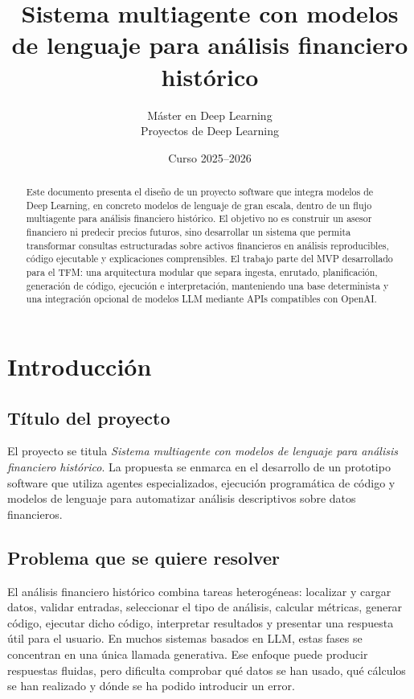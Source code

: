 \documentclass[11pt,a4paper]{article}
\title{\textbf{Sistema multiagente con modelos de lenguaje para an\'alisis financiero hist\'orico}}
\author{M\'aster en Deep Learning\\Proyectos de Deep Learning}
\date{Curso 2025--2026}
\let\oldsection\section
\renewcommand{\section}{\clearpage\oldsection}
\begin{document}
\maketitle

\begin{abstract}
Este documento presenta el dise\~no de un proyecto software que integra modelos de Deep Learning, en concreto modelos de lenguaje de gran escala, dentro de un flujo multiagente para an\'alisis financiero hist\'orico. El objetivo no es construir un asesor financiero ni predecir precios futuros, sino desarrollar un sistema que permita transformar consultas estructuradas sobre activos financieros en an\'alisis reproducibles, c\'odigo ejecutable y explicaciones comprensibles. El trabajo parte del MVP desarrollado para el TFM: una arquitectura modular que separa ingesta, enrutado, planificaci\'on, generaci\'on de c\'odigo, ejecuci\'on e interpretaci\'on, manteniendo una base determinista y una integraci\'on opcional de modelos LLM mediante APIs compatibles con OpenAI.
\end{abstract}

\tableofcontents
\newpage

\section{Introducci\'on}

\subsection{T\'itulo del proyecto}

El proyecto se titula \textit{Sistema multiagente con modelos de lenguaje para an\'alisis financiero hist\'orico}. La propuesta se enmarca en el desarrollo de un prototipo software que utiliza agentes especializados, ejecuci\'on program\'atica de c\'odigo y modelos de lenguaje para automatizar an\'alisis descriptivos sobre datos financieros.

\subsection{Problema que se quiere resolver}

El an\'alisis financiero hist\'orico combina tareas heterog\'eneas: localizar y cargar datos, validar entradas, seleccionar el tipo de an\'alisis, calcular m\'etricas, generar c\'odigo, ejecutar dicho c\'odigo, interpretar resultados y presentar una respuesta \'util para el usuario. En muchos sistemas basados en LLM, estas fases se concentran en una \'unica llamada generativa. Ese enfoque puede producir respuestas fluidas, pero dificulta comprobar qu\'e datos se han usado, qu\'e c\'alculos se han realizado y d\'onde se ha podido introducir un error.
\end{document}
